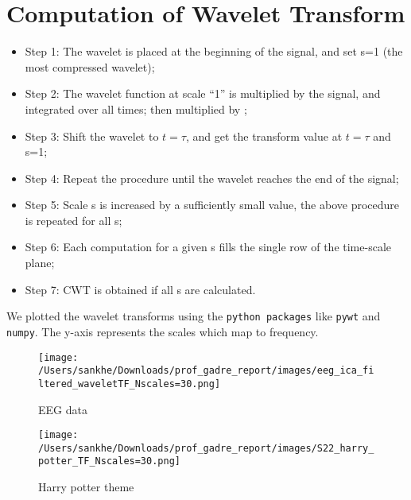 \section{Computation of Wavelet Transform}
\begin{itemize}
\item Step 1: The wavelet is placed at the beginning of the signal, and set s=1 (the most compressed wavelet);
\item Step 2: The wavelet function at scale “1” is multiplied by the signal, and integrated over all times; then multiplied by       ;
\item Step 3: Shift the wavelet to $t= \tau$, and get the transform value at $t= \tau$ and s=1;
\item Step 4: Repeat the procedure until the wavelet reaches the end of the signal;
\item Step 5: Scale s is increased by a sufficiently small value, the above procedure is repeated for all s;
\item Step 6: Each computation for a given s fills the single row of the time-scale plane;
\item Step 7: CWT is obtained if all s are calculated.
\end{itemize}



We plotted the wavelet transforms using the \texttt{python packages} like \texttt{pywt} and \texttt{numpy}. The y-axis represents the scales which map to frequency. 

  \begin{figure}[h!]
	\texttt{[image: /Users/sankhe/Downloads/prof\_gadre\_report/images/eeg\_ica\_filtered\_waveletTF\_Nscales=30.png]}
	\caption{EEG data}
	\label{fig:result1}
  \end{figure}

  \begin{figure}[h!]
	\texttt{[image: /Users/sankhe/Downloads/prof\_gadre\_report/images/S22\_harry\_potter\_TF\_Nscales=30.png]}
	\caption{Harry potter theme}
	\label{fig:result1}
  \end{figure}
	
	
 
